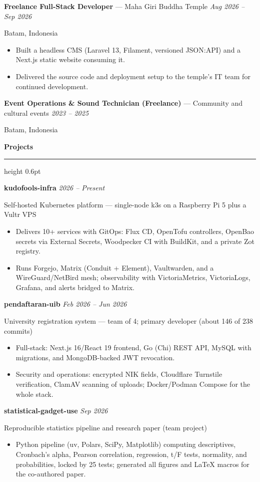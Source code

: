 \documentclass[10pt,a4paper]{article}
\newcommand{\cvsection}[1]{%
  \vspace{3pt}%
  {\large\bfseries #1}\par\vspace{1pt}%
  \hrule height 0.6pt\vspace{2pt}%
}
\newcommand{\cventry}[4]{%
  \textbf{#1} --- #2 \hfill \textit{#4}\par
  {\small #3}\par
}
\newcommand{\projentry}[3]{%
  \textbf{#1} \hfill \textit{#3}\par
  {\small #2}\par
}
\begin{document}
\cventry{Freelance Full-Stack Developer}{Maha Giri Buddha Temple}{Batam, Indonesia}{Aug 2026 -- Sep 2026}
\begin{itemize}
  \item Built a headless CMS (Laravel 13, Filament, versioned JSON:API) and a Next.js static website consuming it.
  \item Delivered the source code and deployment setup to the temple's IT team for continued development.
\end{itemize}

\cventry{Event Operations \& Sound Technician (Freelance)}{Community and cultural events}{Batam, Indonesia}{2023 -- 2025}

\cvsection{Projects}

\projentry{kudofools-infra}{Self-hosted Kubernetes platform --- single-node k3s on a Raspberry Pi 5 plus a Vultr VPS}{2026 -- Present}
\begin{itemize}
  \item Delivers 10+ services with GitOps: Flux CD, OpenTofu controllers, OpenBao secrets via External Secrets, Woodpecker CI with BuildKit, and a private Zot registry.
  \item Runs Forgejo, Matrix (Conduit + Element), Vaultwarden, and a WireGuard/NetBird mesh; observability with VictoriaMetrics, VictoriaLogs, Grafana, and alerts bridged to Matrix.
\end{itemize}

\projentry{pendaftaran-uib}{University registration system --- team of 4; primary developer (about 146 of 238 commits)}{Feb 2026 -- Jun 2026}
\begin{itemize}
  \item Full-stack: Next.js 16/React 19 frontend, Go (Chi) REST API, MySQL with migrations, and MongoDB-backed JWT revocation.
  \item Security and operations: encrypted NIK fields, Cloudflare Turnstile verification, ClamAV scanning of uploads; Docker/Podman Compose for the whole stack.
\end{itemize}

\projentry{statistical-gadget-use}{Reproducible statistics pipeline and research paper (team project)}{Sep 2026}
\begin{itemize}
  \item Python pipeline (uv, Polars, SciPy, Matplotlib) computing descriptives, Cronbach's alpha, Pearson correlation, regression, t/F tests, normality, and probabilities, locked by 25 tests; generated all figures and LaTeX macros for the co-authored paper.
\end{itemize}
\end{document}
